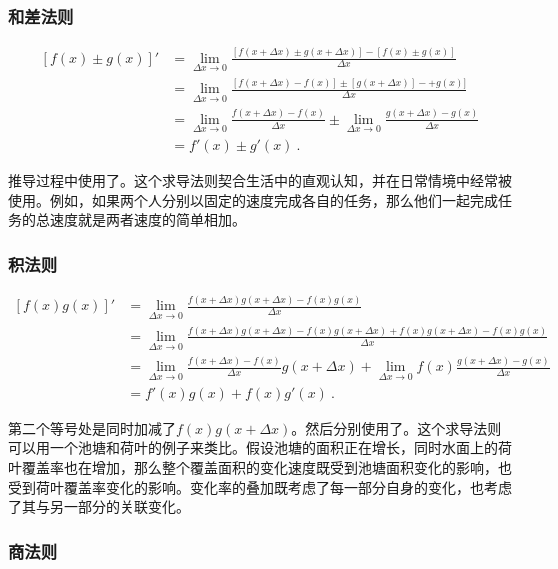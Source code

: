 \subsubsection{和差法则}

\begin{equation}
\begin{split}
\left[f(x)\pm g(x)\right]'&=\lim_{\Delta x\to 0}\frac{[f(x+\Delta x)\pm g(x+\Delta x)]-[f(x)\pm g(x)]}{\Delta x}\\
&=\lim_{\Delta x\to 0}\frac{[f(x+\Delta x)-f(x)]\pm [g(x+\Delta x)]-+g(x)]}{\Delta x}\\
&=\lim_{\Delta x\to 0}\frac{f(x+\Delta x)-f(x)}{\Delta x}\pm\lim_{\Delta x\to 0}\frac{g(x+\Delta x)-g(x)}{\Delta x}\\
&=f'(x)\pm g'(x)~.
\end{split}
\end{equation}

推导过程中使用了。这个求导法则契合生活中的直观认知，并在日常情境中经常被使用。例如，如果两个人分别以固定的速度完成各自的任务，那么他们一起完成任务的总速度就是两者速度的简单相加。

\subsubsection{积法则}

\begin{equation}
\begin{split}
\left[f(x) g(x)\right]'&=\lim_{\Delta x\to 0}\frac{f(x+\Delta x) g(x+\Delta x)-f(x) g(x)}{\Delta x}\\
&=\lim_{\Delta x\to 0}\frac{f(x+\Delta x) g(x+\Delta x)-f(x) g(x+\Delta x)+f(x) g(x+\Delta x)-f(x) g(x)}{\Delta x}\\
&=\lim_{\Delta x\to 0}\frac{f(x+\Delta x)-f(x)}{\Delta x} g(x+\Delta x)+\lim_{\Delta x\to 0}f(x)\frac{g(x+\Delta x)-g(x)}{\Delta x}\\
&=f'(x)g(x)+f(x) g'(x)~.
\end{split}
\end{equation}

第二个等号处是同时加减了$f(x) g(x+\Delta x)$。然后分别使用了。这个求导法则可以用一个池塘和荷叶的例子来类比。假设池塘的面积正在增长，同时水面上的荷叶覆盖率也在增加，那么整个覆盖面积的变化速度既受到池塘面积变化的影响，也受到荷叶覆盖率变化的影响。变化率的叠加既考虑了每一部分自身的变化，也考虑了其与另一部分的关联变化。

\subsubsection{商法则}

